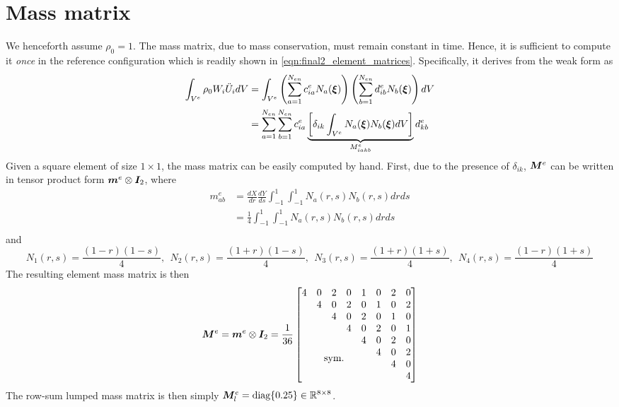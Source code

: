 \section{Mass matrix}
We henceforth assume $\rho_0 = 1$. 
The mass matrix, due to mass conservation, must remain constant in time.
Hence, it is sufficient to compute it \emph{once} in the reference configuration which is readily shown in \cref{eqn:final2_element_matrices}. 
Specifically, it derives from the weak form as 
\begin{equation}
\begin{aligned}
    \int_{V^e}  \rho_0 W_i \ddot{U}_i dV 
    &= \int_{V^e} \left( \sum_{a=1}^{N_{en}} c_{ia}^e N_a(\bm{\xi})\right)\left(\sum_{b=1}^{N_{en}} d_{ib}^e N_b(\bm{\xi}) \right) dV \\
    &= \sum_{a=1}^{N_{en}} \sum_{b=1}^{N_{en}} c_{ia}^e \underbrace{\left[ \delta_{ik} \int_{V^e} N_a(\bm{\xi})N_b(\bm{\xi}) dV \right]}_{M_{iakb}^e} d_{kb}^e \\
\end{aligned}
\end{equation}
Given a square element of size $1 \times 1$, the mass matrix can be easily computed by hand. 
First, due to the presence of $\delta_{ik}$, $\bm{M}^e$ can be written in tensor product form $\bm{m}^e \otimes \bm{I}_2$, where 
\begin{equation}
\begin{aligned}
    m_{ab}^e &= \frac{dX}{dr} \frac{dY}{ds} \int_{-1}^1 \int_{-1}^1 N_a(r, s) N_b(r, s) dr ds  \\
    & = \frac{1}{4} \int_{-1}^1 \int_{-1}^1 N_a(r, s) N_b(r, s) dr ds \\
\end{aligned}
\end{equation}
and 
\begin{equation}
    N_1(r,s) = \frac{(1-r)(1-s)}{4}, ~~ N_2(r,s) = \frac{(1+r)(1-s)}{4}, ~~ N_3(r,s) = \frac{(1+r)(1+s)}{4}, ~~ N_4(r,s) = \frac{(1-r)(1+s)}{4}
\end{equation}
The resulting element mass matrix is then 
\begin{equation}
    \bt{M}^e = \bt{m}^e \otimes \bt{I}_2 = \frac{1}{36}\begin{bmatrix}
        4 & 0 & 2 & 0 & 1 & 0 & 2 & 0 \\
          & 4 & 0 & 2 & 0 & 1 & 0 & 2 \\
          &   & 4 & 0 & 2 & 0 & 1 & 0 \\
          &   &   & 4 & 0 & 2 & 0 & 1 \\
          &   &   &   & 4 & 0 & 2 & 0 \\
          &   &  \multirow{2}{*}{\makebox[0pt]{\text{sym.}}} &   &   & 4 & 0 & 2 \\
          &   &   &   &   &   & 4 & 0 \\
          &   &   &   &   &   &   & 4 \\
    \end{bmatrix}
\end{equation}
The row-sum lumped mass matrix is then simply $\bm{M}_l^e = \textrm{diag}\{0.25\} \in \mathbb{R}^{8\times 8}$. 

